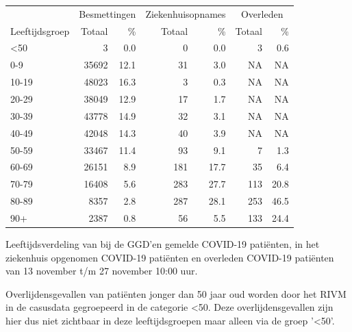 \documentclass[
  english,
  man,floatsintext]{apa6}
\begin{document}
\begin{table}
\centering\begingroup\fontsize{11}{13}\selectfont

\begin{threeparttable}
\begin{tabular}{lrrrrrr}
\toprule
\multicolumn{1}{c}{ } & \multicolumn{2}{c}{Besmettingen} & \multicolumn{2}{c}{Ziekenhuisopnames} & \multicolumn{2}{c}{Overleden} \\
\cmidrule(l{3pt}r{3pt}){2-3} \cmidrule(l{3pt}r{3pt}){4-5} \cmidrule(l{3pt}r{3pt}){6-7}
Leeftijdsgroep & Totaal & \% & Totaal & \% & Totaal & \%\\
\midrule
<50 & 3 & 0.0 & 0 & 0.0 & 3 & 0.6\\
0-9 & 35692 & 12.1 & 31 & 3.0 & NA & NA\\
10-19 & 48023 & 16.3 & 3 & 0.3 & NA & NA\\
20-29 & 38049 & 12.9 & 17 & 1.7 & NA & NA\\
30-39 & 43778 & 14.9 & 32 & 3.1 & NA & NA\\
40-49 & 42048 & 14.3 & 40 & 3.9 & NA & NA\\
50-59 & 33467 & 11.4 & 93 & 9.1 & 7 & 1.3\\
60-69 & 26151 & 8.9 & 181 & 17.7 & 35 & 6.4\\
70-79 & 16408 & 5.6 & 283 & 27.7 & 113 & 20.8\\
80-89 & 8357 & 2.8 & 287 & 28.1 & 253 & 46.5\\
90+ & 2387 & 0.8 & 56 & 5.5 & 133 & 24.4\\
\bottomrule
\end{tabular}
\begin{tablenotes}
\item[1] Leeftijdsverdeling van bij de GGD’en gemelde COVID-19 patiënten, in het ziekenhuis opgenomen COVID-19 patiënten en overleden COVID-19 patiënten van 13 november t/m 27 november 10:00 uur.
\item[2] Overlijdensgevallen van patiënten jonger dan 50 jaar oud worden door het RIVM in de casusdata gegroepeerd in de categorie <50. Deze overlijdensgevallen zijn hier dus niet zichtbaar in deze leeftijdsgroepen maar alleen via de groep '<50'.
\end{tablenotes}
\end{threeparttable}
\endgroup{}
\end{table}

\newpage
\end{document}
